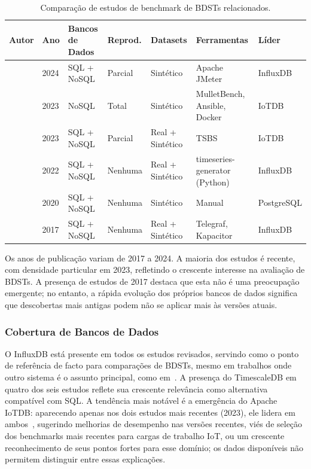 \begin{table}[t]
  \centering
  \footnotesize
  \caption{Comparação de estudos de benchmark de BDSTs relacionados.}
  \label{tab:related}
  \begin{tabular}{lllllll}
    \hline
    \textbf{Autor} & \textbf{Ano} & \textbf{Bancos de Dados} & \textbf{Reprod.} & \textbf{Datasets} & \textbf{Ferramentas} & \textbf{Líder} \\
    \hline
    \cite{lima2024avaliando}       & 2024 & SQL + NoSQL & Parcial & Sintético          & Apache JMeter                 & InfluxDB \\
    \cite{pereira2023mulletbench}  & 2023 & NoSQL       & Total   & Sintético          & MulletBench, Ansible, Docker  & IoTDB    \\
    \cite{wang2023iotdb}           & 2023 & SQL + NoSQL & Parcial & Real + Sintético   & TSBS                          & IoTDB    \\
    \cite{shah2022performance}     & 2022 & SQL + NoSQL & Nenhuma & Real + Sintético   & timeseries-generator (Python) & InfluxDB \\
    \cite{grzesik2020comparative}  & 2020 & SQL + NoSQL & Nenhuma & Sintético          & Manual                        & PostgreSQL \\
    \cite{naqvi2017influxdb}       & 2017 & SQL + NoSQL & Nenhuma & Real + Sintético   & Telegraf, Kapacitor            & InfluxDB \\
    \hline
  \end{tabular}
\end{table}

Os anos de publicação variam de 2017 a 2024. A maioria dos estudos é recente, com densidade
particular em 2023, refletindo o crescente interesse na avaliação de BDSTs. A presença de
estudos de 2017 destaca que esta não é uma preocupação emergente; no entanto, a rápida evolução
dos próprios bancos de dados significa que descobertas mais antigas podem não se aplicar mais às
versões atuais.

\subsubsection{Cobertura de Bancos de Dados}

O InfluxDB está presente em todos os estudos revisados, servindo como o ponto de referência
de facto para comparações de BDSTs, mesmo em trabalhos onde outro sistema é o assunto
principal, como em~\citep{wang2023iotdb}. A presença do TimescaleDB em quatro dos seis estudos
reflete sua crescente relevância como alternativa compatível com SQL. A tendência mais notável
é a emergência do Apache IoTDB: aparecendo apenas nos dois estudos mais recentes (2023), ele
lidera em ambos~\citep{pereira2023mulletbench,wang2023iotdb}, sugerindo melhorias de desempenho
nas versões recentes, viés de seleção dos benchmarks mais recentes para cargas de trabalho IoT,
ou um crescente reconhecimento de seus pontos fortes para esse domínio; os dados disponíveis
não permitem distinguir entre essas explicações.

